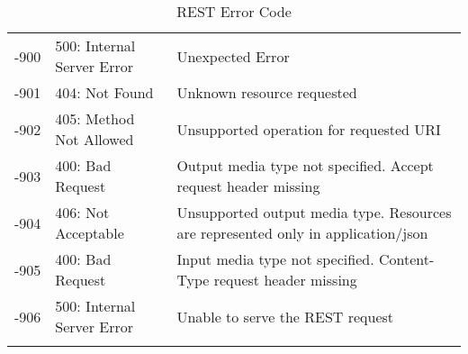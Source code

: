 \begin{longtable}{ | c | l | p{} | }
-900 & 500: Internal Server Error & Unexpected Error \\
-901 & 404: Not Found & Unknown resource requested \\
-902 & 405: Method Not Allowed & Unsupported operation for requested URI \\
-903 & 400: Bad Request & Output media type not specified. Accept request header missing \\
-904 & 406: Not Acceptable & Unsupported output media type. Resources are represented only in application/json \\
-905 & 400: Bad Request & Input media type not specified. Content-Type request header missing \\
-906 & 500: Internal Server Error & Unable to serve the REST request \\\hline
\caption{REST Error Code}
\label{tab:termGlossary}
\end{longtable}